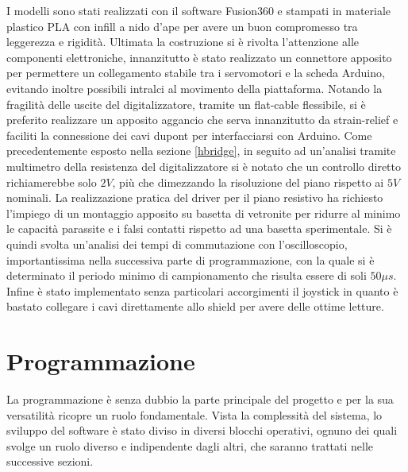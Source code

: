 \documentclass[12pt,twoside,openright]{report}
\begin{document}
I modelli sono stati realizzati con il software Fusion360 e stampati in materiale plastico PLA con infill a nido d'ape per avere un buon compromesso tra leggerezza e rigidità. Ultimata la costruzione si è rivolta l'attenzione alle componenti elettroniche, innanzitutto è stato realizzato un connettore apposito per permettere un collegamento stabile tra i servomotori e la scheda Arduino, evitando inoltre possibili intralci al movimento della piattaforma. Notando la fragilità delle uscite del digitalizzatore, tramite un flat-cable flessibile, si è preferito realizzare un apposito aggancio che serva innanzitutto da strain-relief e faciliti la connessione dei cavi dupont per interfacciarsi con Arduino. Come precedentemente esposto nella sezione \ref{hbridge}, in seguito ad un'analisi tramite multimetro della resistenza del digitalizzatore si è notato che un controllo diretto richiamerebbe solo $2V$, più che dimezzando la risoluzione del piano rispetto ai $5V$ nominali. La realizzazione pratica del driver per il piano resistivo ha richiesto l'impiego di un montaggio apposito su basetta di vetronite per ridurre al minimo le capacità parassite e i falsi contatti rispetto ad una basetta sperimentale. 
Si è quindi svolta un'analisi dei tempi di commutazione con l'oscilloscopio, importantissima nella successiva parte di programmazione, con la quale si è determinato il periodo minimo di campionamento che risulta essere di soli $50\mu s$. Infine è stato implementato senza particolari accorgimenti il joystick in quanto è bastato collegare i cavi direttamente allo shield per avere delle ottime letture.
\newpage
\section{Programmazione}\label{programmazione}
La programmazione è senza dubbio la parte principale del progetto e per la sua versatilità ricopre un ruolo fondamentale. Vista la complessità del sistema, lo sviluppo del software è stato diviso in diversi blocchi operativi, ognuno dei quali svolge un ruolo diverso e indipendente dagli altri, che saranno trattati nelle successive sezioni.
\end{document}
